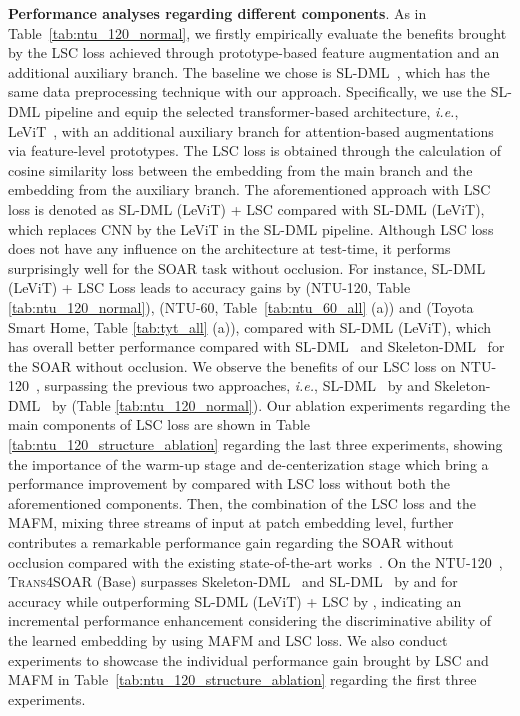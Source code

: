 \documentclass[lettersize,journal]{IEEEtran}
\newcommand{\mypar}[1]{\vspace{0.1cm}\noindent\textbf{#1}.}
\begin{document}
\mypar{Performance analyses regarding different components}
As in Table~\ref{tab:ntu_120_normal}, we firstly empirically evaluate the benefits brought by the LSC loss achieved through prototype-based feature augmentation and an additional auxiliary branch.
The baseline we chose is SL-DML~\cite{memmesheimer2021sl}, which has the same data preprocessing technique with our approach.
Specifically, we use the SL-DML pipeline and equip the selected transformer-based architecture, \textit{i.e.}, LeViT~\cite{graham2021levit}, with an additional auxiliary branch for attention-based augmentations via feature-level prototypes. The LSC loss is obtained through the calculation of cosine similarity loss between the embedding from the main branch and the embedding from the auxiliary branch. The aforementioned approach with LSC loss is denoted as SL-DML (LeViT) + LSC compared with SL-DML (LeViT), which replaces CNN by the LeViT in the SL-DML pipeline.
Although LSC loss does not have any influence on the architecture at test-time, it performs surprisingly well for the SOAR task without occlusion. For instance, SL-DML (LeViT) + LSC Loss leads to accuracy gains by  (NTU-120, Table \ref{tab:ntu_120_normal}),  (NTU-60, Table~\ref{tab:ntu_60_all} (a)) and  (Toyota Smart Home, Table \ref{tab:tyt_all} (a)), compared with SL-DML (LeViT), which has overall better performance compared with SL-DML~\cite{memmesheimer2021sl} and Skeleton-DML~\cite{memmesheimer2020skeleton_dml} for the SOAR without occlusion.
We observe the benefits of our LSC loss on NTU-120~\cite{liu2019ntu}, surpassing the previous two approaches, \textit{i.e.}, SL-DML~\cite{memmesheimer2021sl} by  and Skeleton-DML~\cite{memmesheimer2020skeleton_dml} by  (Table \ref{tab:ntu_120_normal}). 
Our ablation experiments regarding the main components of LSC loss are shown in Table \ref{tab:ntu_120_structure_ablation} regarding the last three experiments, showing the importance of the warm-up stage and de-centerization stage which bring a performance improvement by  compared with LSC loss without both the aforementioned components.
Then, the combination of the LSC loss and the MAFM, mixing three streams of input at patch embedding level, further contributes a remarkable performance gain regarding the SOAR without occlusion compared with the existing state-of-the-art works~\cite{memmesheimer2020skeleton_dml,memmesheimer2020skeleton_dml}. On the NTU-120~\cite{liu2019ntu}, \textsc{Trans4SOAR} (Base) surpasses Skeleton-DML~\cite{memmesheimer2020skeleton_dml} and SL-DML~\cite{memmesheimer2021sl} by  and  for accuracy while outperforming SL-DML (LeViT) + LSC by , indicating an incremental performance enhancement considering the discriminative ability of the learned embedding by using MAFM and LSC loss. We also conduct experiments to showcase the individual performance gain brought by LSC and MAFM in Table~\ref{tab:ntu_120_structure_ablation} regarding the first three experiments.
\end{document}

